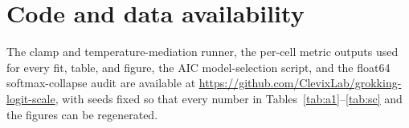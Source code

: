 \section*{Code and data availability}
The clamp and temperature-mediation runner, the per-cell metric outputs used for every fit, table, and
figure, the AIC model-selection script, and the float64 softmax-collapse audit are available at
\url{https://github.com/ClevixLab/grokking-logit-scale}, with seeds fixed so that every number in Tables~\ref{tab:a1}--\ref{tab:sc} and the
figures can be regenerated.
